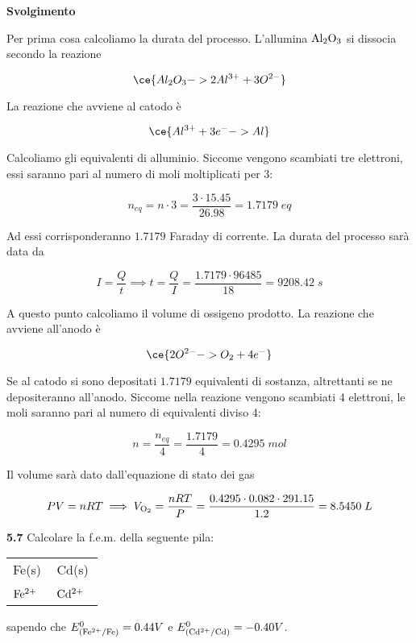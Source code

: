 \vspace{0.2cm}\large\textbf{Svolgimento}\normalsize

\vspace{0.2cm}Per prima cosa calcoliamo la durata del processo. L'allumina $\rm Al_2O_3$ si dissocia secondo la reazione 

$$\ce{Al_2O_3 -> 2Al^{3+} + 3O^{2-}}$$

La reazione che avviene al catodo è

$$\ce{Al^{3+} + 3e^- -> Al }$$

Calcoliamo gli equivalenti di alluminio. Siccome vengono scambiati tre elettroni, essi saranno pari al numero di moli moltiplicati per 3:

$$n_{eq}=n \cdot 3
=\frac{3 \cdot 15.45}{26.98}
=1.7179\;eq$$

Ad essi corrisponderanno $1.7179$ Faraday di corrente. La durata del processo sarà data da

$$I=\frac{Q}{t}
\implies
t=\frac{Q}{I}=\frac{1.7179 \cdot 96485}{18}
=9208.42\;s$$

A questo punto calcoliamo il volume di ossigeno prodotto. La reazione che avviene all'anodo è

$$\ce{2O^{2-} -> O_2 + 4e^-}$$

Se al catodo si sono depositati $1.7179$ equivalenti di sostanza, altrettanti se ne depositeranno all'anodo. Siccome nella reazione vengono scambiati 4 elettroni, le moli saranno pari al numero di equivalenti diviso 4:

$$n=\frac{n_{eq}}{4}
=\frac{1.7179}{4}
=0.4295\;mol$$

Il volume sarà dato dall'equazione di stato dei gas

$$PV=nRT
\implies
V_{\rm O_2}=\frac{nRT}{P}=\frac{0.4295 \cdot 0.082 \cdot 291.15}{1.2}=8.5450 \;L$$

\vspace{0.2cm}\textbf{5.7} Calcolare la f.e.m. della seguente pila:

\begin{center}
    \begin{tabular}{|p{3.7cm}||p{3.7cm}|}
         Fe(s) & Cd(s)\\[0.5ex]
         $\rm Fe^{2+}$ \, \big[0.0120 M\big] & $\rm Cd^{2+}$ \, \big[0.8988 M\big] \\[0.5ex]
    \end{tabular}
\end{center}

sapendo che $E^0_{(\rm Fe^{2+}/Fe)}=0.44V$ e $E^0_{(\rm Cd^{2+}/Cd)}=-0.40V$.

